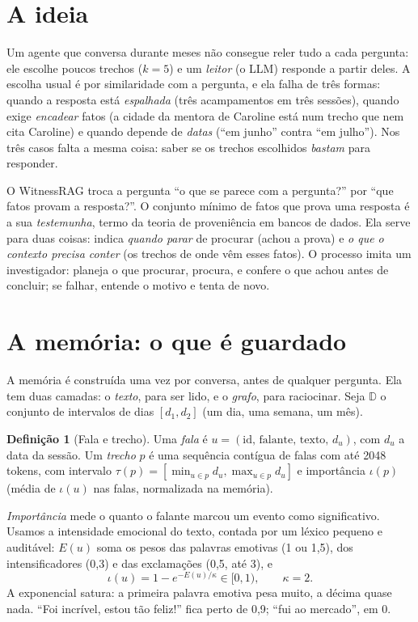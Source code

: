 \documentclass[10pt,twocolumn]{article}
\theoremstyle{definition}
\newtheorem{definicao}{Definição}
\begin{document}
\section{A ideia}
\label{sec:ideia}

Um agente que conversa durante meses não consegue reler tudo a cada pergunta:
ele escolhe poucos trechos ($k=5$) e um \emph{leitor} (o LLM) responde a partir
deles. A escolha usual é por similaridade com a pergunta, e ela falha de três
formas: quando a resposta está \emph{espalhada} (três acampamentos em três
sessões), quando exige \emph{encadear} fatos (a cidade da mentora de Caroline
está num trecho que nem cita Caroline) e quando depende de \emph{datas}
(``em junho'' contra ``em julho''). Nos três casos falta a mesma coisa: saber
se os trechos escolhidos \emph{bastam} para responder.

O WitnessRAG troca a pergunta ``o que se parece com a pergunta?'' por ``que
fatos provam a resposta?''. O conjunto mínimo de fatos que prova uma resposta
é a sua \emph{testemunha}, termo da teoria de proveniência em bancos de dados.
Ela serve para duas coisas: indica \emph{quando parar} de procurar (achou a
prova) e \emph{o que o contexto precisa conter} (os trechos de onde vêm esses
fatos). O processo imita um investigador: planeja o que procurar, procura, e
confere o que achou antes de concluir; se falhar, entende o motivo e tenta de
novo.

\section{A memória: o que é guardado}
\label{sec:memoria}

A memória é construída uma vez por conversa, antes de qualquer pergunta. Ela
tem duas camadas: o \emph{texto}, para ser lido, e o \emph{grafo}, para
raciocinar. Seja $\mathbb{D}$ o conjunto de intervalos de dias $[d_1,d_2]$
(um dia, uma semana, um mês).

\begin{definicao}[Fala e trecho]
Uma \emph{fala} é $u=(\mathrm{id},\,\mathrm{falante},\,\mathrm{texto},\,d_u)$,
com $d_u$ a data da sessão. Um \emph{trecho} $p$ é uma sequência contígua de
falas com até 2048 tokens, com intervalo
$\tau(p)=[\min_{u\in p}d_u,\max_{u\in p}d_u]$ e importância $\iota(p)$ (média
de $\iota(u)$ nas falas, normalizada na memória).
\end{definicao}

\emph{Importância} mede o quanto o falante marcou um evento como significativo.
Usamos a intensidade emocional do texto, contada por um léxico pequeno e
auditável: $E(u)$ soma os pesos das palavras emotivas (1 ou 1{,}5), dos
intensificadores (0{,}3) e das exclamações (0{,}5, até 3), e
\begin{equation}\label{eq:imp}
\iota(u)=1-e^{-E(u)/\kappa}\in[0,1),\qquad \kappa=2.
\end{equation}
A exponencial satura: a primeira palavra emotiva pesa muito, a décima quase
nada. ``Foi incrível, estou tão feliz!'' fica perto de 0{,}9; ``fui ao
mercado'', em 0.
\end{document}
